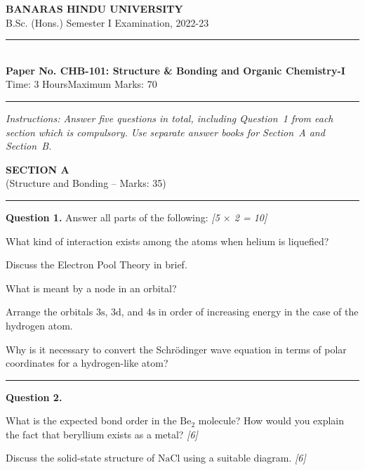 \documentclass[11pt,a4paper]{article}
\newcommand{\pts}[1]{\hfill   \textit{[#1]}}
\begin{document}
\begin{center}
  {\large\bfseries BANARAS HINDU UNIVERSITY}\\[2pt]
  {\normalsize B.Sc. (Hons.) Semester I Examination, 2022-23}\\[6pt]
  \rule{0.8\linewidth}{0.5pt}\\[6pt]
  {\large\bfseries Paper No. CHB-101: Structure \& Bonding and Organic Chemistry-I}\\[4pt]
  {\normalsize Time: 3 Hours\hfill Maximum Marks: 70}
\end{center}
\rule{\linewidth}{0.4pt}
\small



\noindent   \textit{Instructions: Answer five questions in total, including Question~1 from each section which is compulsory. Use separate answer books for Section~A and Section~B.}

\normalsize
\bigskip


\begin{center}
  {\large\bfseries SECTION A}\\[2pt]
  {\normalsize (Structure and Bonding -- Marks: 35)}
\end{center}
\rule{0.4\linewidth}{0.2pt}
\smallskip




\noindent   \textbf{Question 1.} Answer all parts of the following: \pts{5 $ \times$ 2 = 10}

\begin{parts}
  \item What kind of interaction exists among the atoms when helium is liquefied?
  \item Discuss the Electron Pool Theory in brief.
  \item What is meant by a node in an orbital?
  \item Arrange the orbitals $3 \text{s}$, $3 \text{d}$, and $4 \text{s}$ in order of increasing energy in the case of the hydrogen atom.
  \item Why is it necessary to convert the Schr\"odinger wave equation in terms of polar coordinates for a hydrogen-like atom?
\end{parts}

\medskip\rule{\linewidth}{0.2pt}




\noindent   \textbf{Question 2.}

\begin{parts}
  \item What is the expected bond order in the $ \text{Be}_2$ molecule? How would you explain the fact that beryllium exists as a metal? \pts{6}
  \item Discuss the solid-state structure of $ \text{NaCl}$ using a suitable diagram. \pts{6}
\end{parts}
\end{document}
